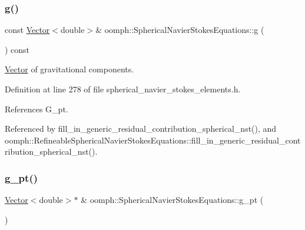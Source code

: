 \mbox{\label{classoomph_1_1SphericalNavierStokesEquations_ac580f29734c9595980428b8324099d7d}} 
\subsubsection{\texorpdfstring{g()}{g()}}
{\footnotesize\ttfamily const \hyperlink{classoomph_1_1Vector}{Vector}$<$double$>$\& oomph\+::\+Spherical\+Navier\+Stokes\+Equations\+::g (\begin{DoxyParamCaption}{ }\end{DoxyParamCaption}) const\hspace{0.3cm}{\ttfamily [inline]}}



\hyperlink{classoomph_1_1Vector}{Vector} of gravitational components. 



Definition at line 278 of file spherical\+\_\+navier\+\_\+stokes\+\_\+elements.\+h.



References G\+\_\+pt.



Referenced by fill\+\_\+in\+\_\+generic\+\_\+residual\+\_\+contribution\+\_\+spherical\+\_\+nst(), and oomph\+::\+Refineable\+Spherical\+Navier\+Stokes\+Equations\+::fill\+\_\+in\+\_\+generic\+\_\+residual\+\_\+contribution\+\_\+spherical\+\_\+nst().

\mbox{\label{classoomph_1_1SphericalNavierStokesEquations_abf7999df2161b8a7b14ca10352b27468}} 
\subsubsection{\texorpdfstring{g\+\_\+pt()}{g\_pt()}}
{\footnotesize\ttfamily \hyperlink{classoomph_1_1Vector}{Vector}$<$double$>$$\ast$ \& oomph\+::\+Spherical\+Navier\+Stokes\+Equations\+::g\+\_\+pt (\begin{DoxyParamCaption}{ }\end{DoxyParamCaption})\hspace{0.3cm}{\ttfamily [inline]}}



